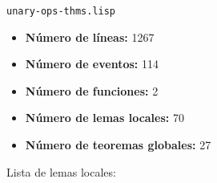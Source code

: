 \documentclass[a4paper,10pt]{article}
\begin{document}
\par \vspace{24pt}
\texttt{unary-ops-thms.lisp}

\par \vspace{10pt}

\begin{itemize}
	\item \textbf{Número de líneas:} 1267
	\item \textbf{Número de eventos:} 114
	\item \textbf{Número de funciones:} 2
	\item \textbf{Número de lemas locales:} 70
	\item \textbf{Número de teoremas globales:} 27
\end{itemize}

\par \vspace{10pt}

Lista de lemas locales:

\par \vspace{10pt}
\end{document}
